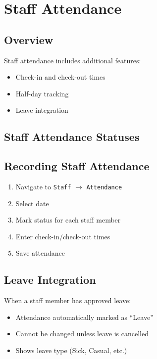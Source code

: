 \documentclass[12pt,a4paper]{report}
\begin{document}
\chapter{Staff Attendance}

\section{Overview}

Staff attendance includes additional features:
\begin{itemize}[leftmargin=*]
    \item Check-in and check-out times
    \item Half-day tracking
    \item Leave integration
\end{itemize}

\section{Staff Attendance Statuses}

\begin{center}
\end{center}

\section{Recording Staff Attendance}

\begin{enumerate}[leftmargin=*]
    \item Navigate to \texttt{Staff} $\rightarrow$ \texttt{Attendance}
    \item Select date
    \item Mark status for each staff member
    \item Enter check-in/check-out times
    \item Save attendance
\end{enumerate}

\section{Leave Integration}

When a staff member has approved leave:
\begin{itemize}[leftmargin=*]
    \item Attendance automatically marked as ``Leave''
    \item Cannot be changed unless leave is cancelled
    \item Shows leave type (Sick, Casual, etc.)
\end{itemize}
\end{document}
